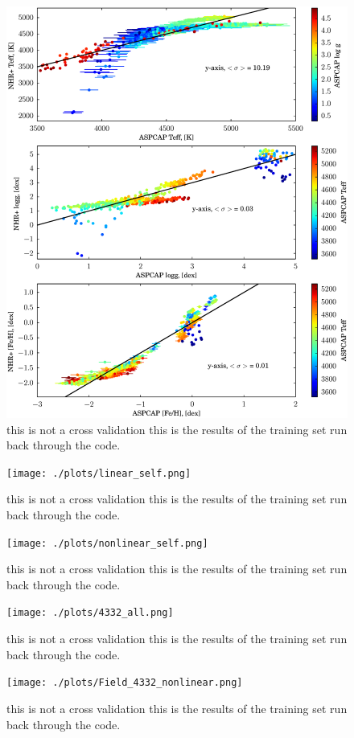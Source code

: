 \documentclass[12pt, preprint]{aastex}
\begin{document}
\begin{figure}[h!]
  \includegraphics[width=\hsize]{./plots/fits_all3_self.eps}
\caption{this is not a cross validation this is the results of the training set run back through the code. }
\label{fig:cal_teff}
\end{figure}

\begin{figure}[h!]
  \texttt{[image: ./plots/linear\_self.png]}
\caption{this is not a cross validation this is the results of the training set run back through the code. }
\label{fig:cal_teff}
\end{figure}

\begin{figure}[h!]
  \texttt{[image: ./plots/nonlinear\_self.png]}
\caption{this is not a cross validation this is the results of the training set run back through the code. }
\label{fig:cal_teff}
\end{figure}

\begin{figure}[h!]
  \texttt{[image: ./plots/4332\_all.png]}
\caption{this is not a cross validation this is the results of the training set run back through the code. }
\label{fig:cal_teff}
\end{figure}

\begin{figure}[h!]
  \texttt{[image: ./plots/Field\_4332\_nonlinear.png]}
\caption{this is not a cross validation this is the results of the training set run back through the code. }
\label{fig:cal_teff}
\end{figure}
\end{document}
